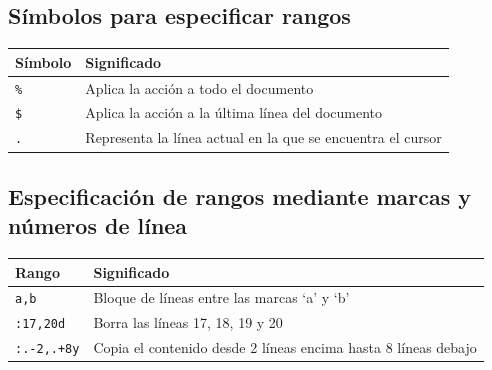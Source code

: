 \documentclass[
  doc,
  floatsintext,
  longtable,
  a4paper,
  nolmodern,
  notxfonts,
  notimes,
  12pt,
  colorlinks=true,linkcolor=blue,citecolor=blue,urlcolor=blue]{apa7}
\newcounter{none} %
\begin{document}
\subsection{Símbolos para especificar
rangos}\label{suxedmbolos-para-especificar-rangos}

{\def\LTcaptype{none} %
\begin{longtable}[]{@{}
  >{\raggedright\arraybackslash}p{}
  >{\raggedright\arraybackslash}p{}@{}}
\toprule\noalign{}
\begin{minipage}[b]{\linewidth}\raggedright
Símbolo
\end{minipage} & \begin{minipage}[b]{\linewidth}\raggedright
Significado
\end{minipage} \\
\midrule\noalign{}
\endhead
\bottomrule\noalign{}
\endlastfoot
\texttt{\%} & Aplica la acción a todo el documento \\
\texttt{\$} & Aplica la acción a la última línea del documento \\
\texttt{.} & Representa la línea actual en la que se encuentra el
cursor \\
\end{longtable}
}

\subsection{Especificación de rangos mediante marcas y números de
línea}\label{especificaciuxf3n-de-rangos-mediante-marcas-y-nuxfameros-de-luxednea}

{\def\LTcaptype{none} %
\begin{longtable}[]{@{}
  >{\raggedright\arraybackslash}p{}
  >{\raggedright\arraybackslash}p{}@{}}
\toprule\noalign{}
\begin{minipage}[b]{\linewidth}\raggedright
Rango
\end{minipage} & \begin{minipage}[b]{\linewidth}\raggedright
Significado
\end{minipage} \\
\midrule\noalign{}
\endhead
\bottomrule\noalign{}
\endlastfoot
\texttt{\textquotesingle{}a,\textquotesingle{}b} & Bloque de líneas
entre las marcas `a' y `b' \\
\texttt{:17,20d} & Borra las líneas 17, 18, 19 y 20 \\
\texttt{:.-2,.+8y} & Copia el contenido desde 2 líneas encima hasta 8
líneas debajo \\
\end{longtable}
}
\end{document}
